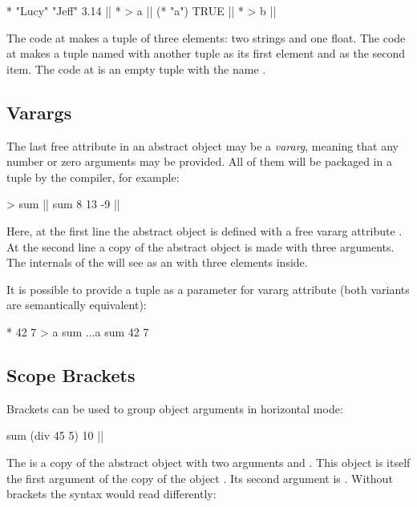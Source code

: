 \begin{ffcode}
* "Lucy" "Jeff" 3.14 |$\label{ln:tuple-1}$|
* > a |$\label{ln:tuple-2a}$|
  (* "a")
  TRUE |$\label{ln:tuple-2b}$|
* > b |$\label{ln:tuple-3}$|
\end{ffcode}

The code at  makes a tuple of three elements: two strings
and one float. The code at  makes a tuple named  with another
tuple as its first element and  as the second item.
The code at  is an empty tuple with the name .

\subsection{Varargs}

The last free attribute in an abstract object may be a \emph{vararg},
meaning that any number or zero arguments may be provided. All of them
will be packaged in a tuple by the compiler, for example:

\begin{ffcode}
[x...] > sum |$\label{ln:sum-def}$|
sum 8 13 -9 |$\label{ln:sum-instance}$|
\end{ffcode}

Here, at the first line the abstract object  is defined
with a free vararg attribute . At the second line a copy of the
abstract object is made with three arguments. The internals of
the  will see  as an  with three
elements inside.

It is possible to provide a tuple as a parameter for vararg attribute
(both variants are semantically equivalent):

\begin{ffcode}
* 42 7 > a
sum ...a
sum 42 7
\end{ffcode}

\subsection{Scope Brackets}

Brackets can be used to group object arguments in horizontal mode:

\begin{ffcode}
sum (div 45 5) 10  |$\label{ln:sum}$|
\end{ffcode}

The  is a copy of the abstract object 
with two arguments  and . This object is itself
the first argument of the copy of the object . Its second
argument is . Without brackets the syntax would read differently:

